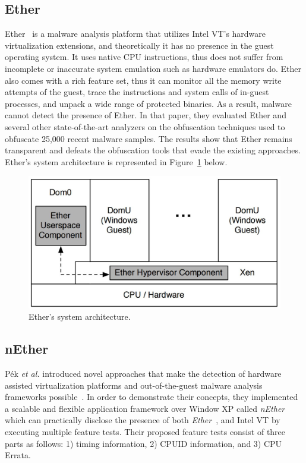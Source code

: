 \subsection{Ether}
Ether~\cite{ether} is a malware analysis platform that utilizes 
Intel VT's hardware virtualization extensions, and theoretically it has no presence 
in the guest operating system. It uses native CPU instructions, thus does not suffer from 
incomplete or inaccurate system emulation such as hardware emulators do. 
Ether also comes with a rich feature set, thus it can monitor 
all the memory write attempts of the guest, trace the instructions and 
system calls of in-guest processes, and unpack a wide range of protected binaries. 
As a result, malware cannot detect the presence of Ether. In that paper, 
they evaluated Ether and several other state-of-the-art analyzers on the obfuscation techniques 
used to obfuscate 25,000 recent malware samples. The results show that Ether remains transparent 
and defeats the obfuscation tools that evade the existing approaches. 
Ether's system architecture is represented in Figure~\ref{fig:ether} below.

\begin{figure}[!h]
	\centering
	\includegraphics[width=\linewidth]{figure/ether.png}
	\caption{Ether's system architecture.}
	\label{fig:ether}
\end{figure}

\subsection{nEther}
P{\'e}k \textit{et al.} introduced novel approaches that make the detection of hardware assisted virtualization platforms and out-of-the-guest malware analysis frameworks possible~\cite{nether}. In order to demonstrate their concepts, they implemented a scalable and flexible application framework over Window XP called \textit{nEther} which can practically disclose the presence of both \textit{Ether}~\cite{ether}, and Intel VT by executing multiple feature tests. Their proposed feature tests consist of three parts as follows: 1) timing information, 2) CPUID information, and 3) CPU Errata. 


